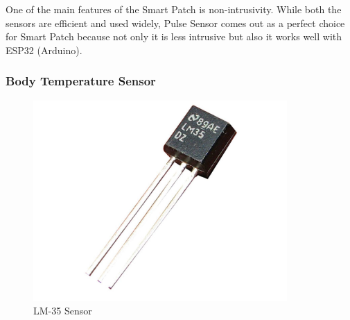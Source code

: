 One of the main features of the Smart Patch is non-intrusivity. While both the sensors are efficient and used widely, Pulse Sensor comes out as a perfect choice for Smart Patch because not only it is less intrusive but also it works well with ESP32 (Arduino).

\subsubsection{Body Temperature Sensor}

\begin{figure}[!h]
    \centering
    \includegraphics[width=0.25\linewidth]{images/lm-35-image.png}
    \caption{LM-35 Sensor \cite{ref28}}
    \label{fig:lm-35-sensor}
\end{figure}


